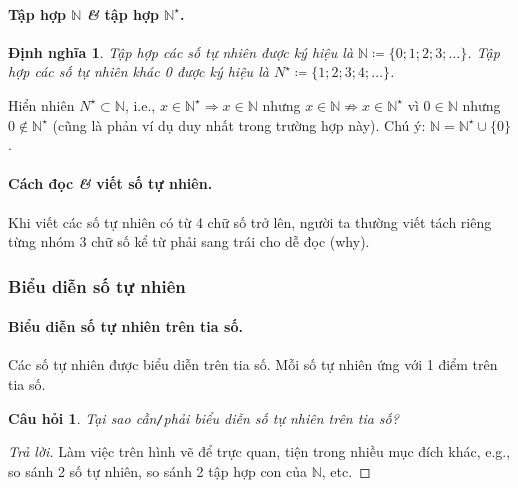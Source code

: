 \documentclass{article}
\numberwithin{equation}{section}
\newtheorem{definition}{Định nghĩa}[section]
\newtheorem{question}{Câu hỏi}[section]
\begin{document}
\paragraph{Tập hợp $\mathbb{N}$ \textit{\&} tập hợp $\mathbb{N}^\star$.}
\begin{definition}
	\emph{Tập hợp các số tự nhiên} được ký hiệu là $\mathbb{N}\coloneqq\{0;1;2;3;\ldots\}$. \emph{Tập hợp các số tự nhiên khác 0} được ký hiệu là $N^\star\coloneqq\{1;2;3;4;\ldots\}$.
\end{definition}
Hiển nhiên $N^\star\subset\mathbb{N}$, i.e., $x\in\mathbb{N}^\star\Rightarrow x\in\mathbb{N}$ nhưng $x\in\mathbb{N}\not\Rightarrow x\in\mathbb{N}^\star$ vì $0\in\mathbb{N}$ nhưng $0\notin\mathbb{N}^\star$ (cũng là phản ví dụ duy nhất trong trường hợp này). Chú ý: $\mathbb{N} = \mathbb{N}^\star\cup\{0\}$.

\paragraph{Cách đọc \textit{\&} viết số tự nhiên.} Khi viết các số tự nhiên có từ 4 chữ số trở lên, người ta thường viết tách riêng từng nhóm 3 chữ số kể từ phải sang trái cho dễ đọc (why).

\subsubsection{Biểu diễn số tự nhiên}

\paragraph{Biểu diễn số tự nhiên trên tia số.} Các số tự nhiên được biểu diễn trên tia số. Mỗi số tự nhiên ứng với 1 điểm trên tia số.

\begin{question}
	Tại sao cần\emph{\texttt{/}}phải biểu diễn số tự nhiên trên tia số?
\end{question}

\begin{proof}[Trả lời]
	Làm việc trên hình vẽ để trực quan, tiện trong nhiều mục đích khác, e.g., so sánh 2 số tự nhiên, so sánh 2 tập hợp con của $\mathbb{N}$, etc.
\end{proof}
\end{document}
